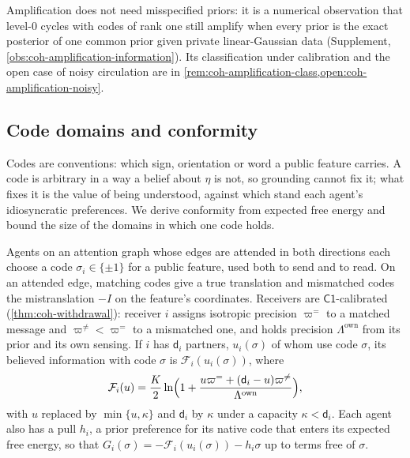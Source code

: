 Amplification does not need misspecified priors: it is a numerical observation that level-0 cycles with codes of rank one still amplify when every prior is the exact posterior of one common prior given private linear-Gaussian data (Supplement, \cref{obs:coh-amplification-information}). Its classification under calibration and the open case of noisy circulation are in \cref{rem:coh-amplification-class,open:coh-amplification-noisy}.

\subsection{Code domains and conformity}\label{sec:coh-codes}

Codes are conventions: which sign, orientation or word a public feature carries. A code is arbitrary in a way a belief about $\eta$ is not, so grounding cannot fix it; what fixes it is the value of being understood, against which stand each agent's idiosyncratic preferences. We derive conformity from expected free energy and bound the size of the domains in which one code holds.

\begin{definition}\label{def:coh-code-game}
Agents on an attention graph whose edges are attended in both directions each choose a code $\sigma_i\in\{\pm1\}$ for a public feature, used both to send and to read. On an attended edge, matching codes give a true translation and mismatched codes the mistranslation $-I$ on the feature's coordinates. Receivers are $\mathsf{C1}$-calibrated (\cref{thm:coh-withdrawal}): receiver $i$ assigns isotropic precision $\varpi^{=}$ to a matched message and $\varpi^{\neq}<\varpi^{=}$ to a mismatched one, and holds precision $\Lambda^{\mathrm{own}}$ from its prior and its own sensing. If $i$ has $\mathsf d_i$ partners, $u_i(\sigma)$ of whom use code $\sigma$, its believed information with code $\sigma$ is $\mathcal F_i(u_i(\sigma))$, where
\begin{equation}\label{eq:coh-value}
\mathcal F_i(u)=\frac K2\ln\Bigl(1+\frac{u\varpi^{=}+(\mathsf d_i-u)\varpi^{\neq}}{\Lambda^{\mathrm{own}}}\Bigr),
\end{equation}
with $u$ replaced by $\min\{u,\kappa\}$ and $\mathsf d_i$ by $\kappa$ under a capacity $\kappa<\mathsf d_i$. Each agent also has a pull $h_i$, a prior preference for its native code that enters its expected free energy, so that $G_i(\sigma)=-\mathcal F_i(u_i(\sigma))-h_i\sigma$ up to terms free of $\sigma$.
\end{definition}

